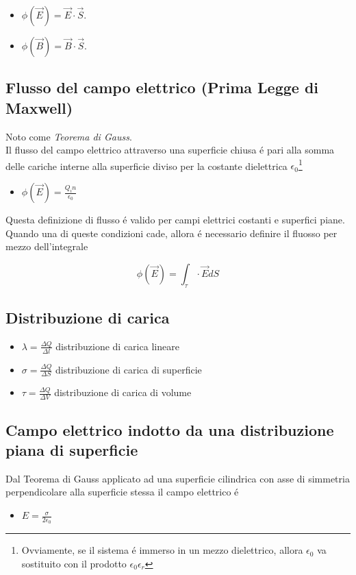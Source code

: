 \documentclass[17pt]{extarticle}
\begin{document}
\begin{itemize}
	\item $\phi(\vec{E}) = \vec{E}\cdot\vec{S}$.
	\item $\phi(\vec{B}) = \vec{B}\cdot\vec{S}$.
\end{itemize}	

\subsection{Flusso del campo elettrico (Prima Legge di Maxwell)}
Noto come \emph{Teorema di Gauss}.\\
Il flusso del campo elettrico attraverso una superficie chiusa \'e pari alla somma delle cariche interne alla superficie diviso per la costante dielettrica $\epsilon_0$\footnote{Ovviamente, se il sistema \'e immerso in un mezzo dielettrico, allora $\epsilon_0$ va sostituito con il prodotto $\epsilon_0\epsilon_r$}


\begin{itemize}
	\item $\phi(\vec{E}) = \frac{Q_in}{\epsilon_0}$
\end{itemize}

Questa definizione di flusso \'e valido per campi elettrici costanti e superfici piane. Quando una di queste condizioni cade, allora \'e necessario definire il fluosso per mezzo dell'integrale

$$
\phi(\vec{E}) = \int_{\tau}\cdot\vec{E}dS
$$

\subsection{Distribuzione di carica }

\begin{itemize}
	\item $\lambda = \frac{\Delta Q}{\Delta l}$ distribuzione di carica lineare
	\item $\sigma = \frac{\Delta Q}{\Delta S}$ distribuzione di carica di superficie
	\item $\tau = \frac{\Delta Q}{\Delta V}$ distribuzione di carica di volume
\end{itemize}

\subsection{Campo elettrico indotto da una distribuzione piana di superficie}

Dal Teorema di Gauss applicato ad una superficie cilindrica con asse di simmetria perpendicolare alla superficie stessa il campo elettrico \'e
\begin{itemize}
	\item $E = \frac{\sigma}{2\epsilon_0}$
\end{itemize}
\end{document}
